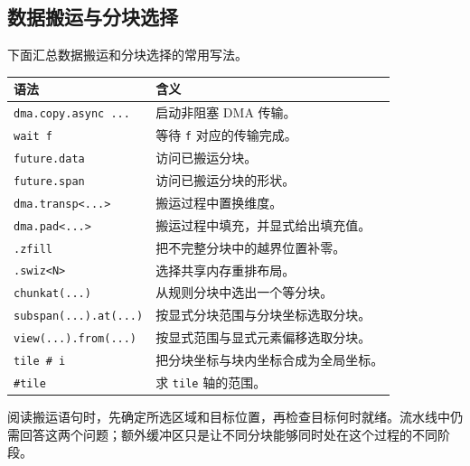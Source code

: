 \subsection*{数据搬运与分块选择}

下面汇总数据搬运和分块选择的常用写法。

\begin{table}[htbp]\centering\small
\begin{tabularx}{\linewidth}{@{}lX@{}}
\toprule
语法 & 含义 \\
\midrule
\texttt{dma.copy.async ...} & 启动非阻塞 DMA 传输。 \\
\texttt{wait f} & 等待 \texttt{f} 对应的传输完成。 \\
\texttt{future.data} & 访问已搬运分块。 \\
\texttt{future.span} & 访问已搬运分块的形状。 \\
\texttt{dma.transp\textless{}...\textgreater{}} & 搬运过程中置换维度。 \\
\texttt{dma.pad\textless{}...\textgreater{}} & 搬运过程中填充，并显式给出填充值。 \\
\texttt{.zfill} & 把不完整分块中的越界位置补零。 \\
\texttt{.swiz\textless{}N\textgreater{}} & 选择共享内存重排布局。 \\
\texttt{chunkat(...)} & 从规则分块中选出一个等分块。 \\
\texttt{subspan(...).at(...)} & 按显式分块范围与分块坐标选取分块。 \\
\texttt{view(...).from(...)} & 按显式范围与显式元素偏移选取分块。 \\
\texttt{tile \# i} & 把分块坐标与块内坐标合成为全局坐标。 \\
\texttt{\#tile} & 求 \texttt{tile} 轴的范围。 \\
\bottomrule
\end{tabularx}
\end{table}

阅读搬运语句时，先确定所选区域和目标位置，再检查目标何时就绪。流水线中仍需回答这两个问题；额外缓冲区只是让不同分块能够同时处在这个过程的不同阶段。
